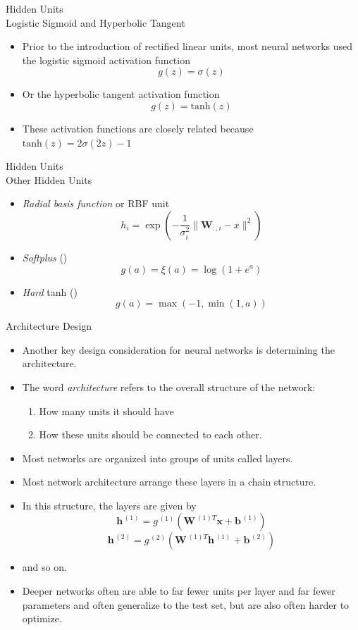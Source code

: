\documentclass[10pt]{beamer}
\begin{document}
	\begin{frame}{Hidden Units \\ Logistic Sigmoid and Hyperbolic Tangent}
		\begin{itemize}
			\item Prior to the introduction of rectified linear units, most neural networks used the logistic sigmoid activation function 
			$$g(z)=\sigma(z)$$
			\item Or the hyperbolic tangent activation function
			$$g(z)=\mathrm{tanh}(z)$$
			\item These activation functions are closely related because $\mathrm{tanh}(z)=2\sigma(2z)-1$
		\end{itemize}
	\end{frame}
	
	\begin{frame}{Hidden Units \\ Other Hidden Units}
		\begin{itemize}
			\item \emph{Radial basis function} or RBF unit
			$$h_i=\exp\left(-\frac{1}{\sigma_i^2}\lVert\bm{W}_{:,i}-x\rVert^2\right)$$
			\item \emph{Softplus} (\citet{dugas2001incorporating})
			$$g(a)=\xi(a)=\log(1+e^a)$$
			\item \emph{Hard} tanh (\citet{collobert2004large})
			$$g(a)=\max(-1,\min(1,a))$$
		\end{itemize}
	\end{frame}

	\begin{frame}{Architecture Design}
		\begin{itemize}
			\item Another key design consideration for neural networks is determining the architecture.
			\item The word \emph{architecture} refers to the overall structure of the network: 
			\begin{enumerate}
				\item How many units it should have
				\item How these units should be connected to each other.
			\end{enumerate}
			\item Most networks are organized into groups of units called layers.
			\item Most network architecture arrange these layers in a chain structure.
			\item In this structure, the layers are given by
			$$\bm{h}^{\,(1)}=g^{\,(1)}(\bm{W}^{\,(1)T}\bm{x}+\bm{b}^{\,(1)})$$
			$$\bm{h}^{\,(2)}=g^{\,(2)}(\bm{W}^{\,(1)T}\bm{h}^{\,(1)}+\bm{b}^{\,(2)})$$ 
			\item and so on.
			\item Deeper networks often are able to far fewer units per layer and far fewer parameters and often generalize to the test set, but are also often harder to optimize.
		\end{itemize}
	\end{frame}
\end{document}
